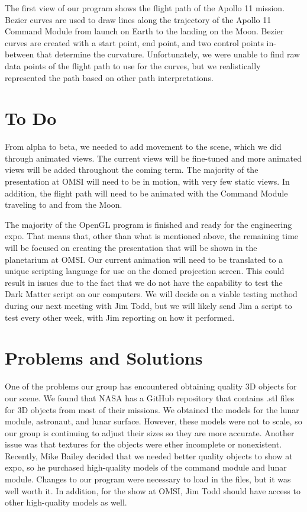 \documentclass[onecolumn, draftclsnofoot,10pt, compsoc]{IEEEtran}
\begin{document}
The first view of our program shows the flight path of the Apollo 11 mission. Bezier curves are used to draw lines along the trajectory of the Apollo 11 Command Module from launch on Earth to the landing on the Moon. Bezier curves are created with a start point, end point, and two control points in-between that determine the curvature. Unfortunately, we were unable to find raw data points of the flight path to use for the curves, but we realistically represented the path based on other path interpretations. 


\section{To Do}

From alpha to beta, we needed to add movement to the scene, which we did through animated views. The current views will be fine-tuned and more animated views will be added throughout the coming term. The majority of the presentation at OMSI will need to be in motion, with very few static views. In addition, the flight path will need to be animated with the Command Module traveling to and from the Moon. 

The majority of the OpenGL program is finished and ready for the engineering expo. That means that, other than what is mentioned above, the remaining time will be focused on creating the presentation that will be shown in the planetarium at OMSI. Our current animation will need to be translated to a unique scripting language for use on the domed projection screen. This could result in issues due to the fact that we do not have the capability to test the Dark Matter script on our computers. We will decide on a viable testing method during our next meeting with Jim Todd, but we will likely send Jim a script to test every other week, with Jim reporting on how it performed. 


\section{Problems and Solutions}

One of the problems our group has encountered obtaining quality 3D objects for our scene. We found that NASA has a GitHub repository that contains .stl files for 3D objects from most of their missions. We obtained the models for the lunar module, astronaut, and lunar surface. However, these models were not to scale, so our group is continuing to adjust their sizes so they are more accurate. Another issue was that textures for the objects were ether incomplete or nonexistent. Recently, Mike Bailey decided that we needed better quality objects to show at expo, so he purchased high-quality models of the command module and lunar module. Changes to our program were necessary to load in the files, but it was well worth it. In addition, for the show at OMSI, Jim Todd should have access to other high-quality models as well.  
\end{document}
